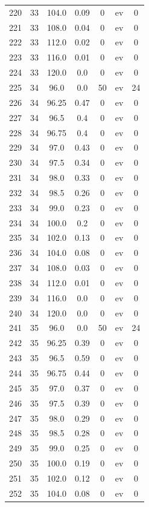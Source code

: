\documentclass[12pt,a4paper]{article}
\begin{document}
\begin{tabular}{r|cccccc}
	220 & 33 & 104.0 & 0.09 & 0 & ev & 0 \\
	221 & 33 & 108.0 & 0.04 & 0 & ev & 0 \\
	222 & 33 & 112.0 & 0.02 & 0 & ev & 0 \\
	223 & 33 & 116.0 & 0.01 & 0 & ev & 0 \\
	224 & 33 & 120.0 & 0.0 & 0 & ev & 0 \\
	225 & 34 & 96.0 & 0.0 & 50 & ev & 24 \\
	226 & 34 & 96.25 & 0.47 & 0 & ev & 0 \\
	227 & 34 & 96.5 & 0.4 & 0 & ev & 0 \\
	228 & 34 & 96.75 & 0.4 & 0 & ev & 0 \\
	229 & 34 & 97.0 & 0.43 & 0 & ev & 0 \\
	230 & 34 & 97.5 & 0.34 & 0 & ev & 0 \\
	231 & 34 & 98.0 & 0.33 & 0 & ev & 0 \\
	232 & 34 & 98.5 & 0.26 & 0 & ev & 0 \\
	233 & 34 & 99.0 & 0.23 & 0 & ev & 0 \\
	234 & 34 & 100.0 & 0.2 & 0 & ev & 0 \\
	235 & 34 & 102.0 & 0.13 & 0 & ev & 0 \\
	236 & 34 & 104.0 & 0.08 & 0 & ev & 0 \\
	237 & 34 & 108.0 & 0.03 & 0 & ev & 0 \\
	238 & 34 & 112.0 & 0.01 & 0 & ev & 0 \\
	239 & 34 & 116.0 & 0.0 & 0 & ev & 0 \\
	240 & 34 & 120.0 & 0.0 & 0 & ev & 0 \\
	241 & 35 & 96.0 & 0.0 & 50 & ev & 24 \\
	242 & 35 & 96.25 & 0.39 & 0 & ev & 0 \\
	243 & 35 & 96.5 & 0.59 & 0 & ev & 0 \\
	244 & 35 & 96.75 & 0.44 & 0 & ev & 0 \\
	245 & 35 & 97.0 & 0.37 & 0 & ev & 0 \\
	246 & 35 & 97.5 & 0.39 & 0 & ev & 0 \\
	247 & 35 & 98.0 & 0.29 & 0 & ev & 0 \\
	248 & 35 & 98.5 & 0.28 & 0 & ev & 0 \\
	249 & 35 & 99.0 & 0.25 & 0 & ev & 0 \\
	250 & 35 & 100.0 & 0.19 & 0 & ev & 0 \\
	251 & 35 & 102.0 & 0.12 & 0 & ev & 0 \\
	252 & 35 & 104.0 & 0.08 & 0 & ev & 0 \\

\end{tabular}
\end{document}
